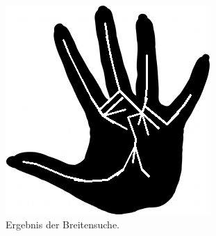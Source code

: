 \begin{figure}[htbp]
\begin{minipage}{5cm}
		\includegraphics[width=1.0\linewidth]{./fig/hand-bfs}
	\end{minipage}
	\caption{Ergebnis der Breitensuche.}
	\label{fig:hand_BFS}
	\end{figure}
